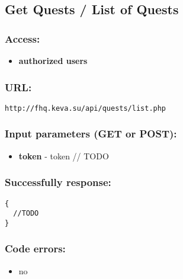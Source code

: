 \subsection{Get Quests / List of Quests}
\par

\subsubsection{Access:}
\begin{itemize}
  \item \textbf{authorized users}
\end{itemize}

\subsubsection{URL:}
\begin{Verbatim}[frame=single]
http://fhq.keva.su/api/quests/list.php
\end{Verbatim}

\subsubsection{Input parameters (GET or POST):}
\begin{itemize}
  \item \textbf{token} - token // TODO
\end{itemize}

\subsubsection{Successfully response:}
\begin{Verbatim}[frame=single]
{
  //TODO
}
\end{Verbatim}

\subsubsection{Code errors:}
\begin{itemize}
	\item no
\end{itemize}

